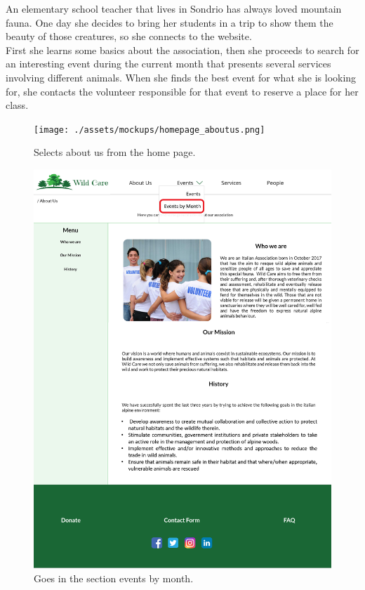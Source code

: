 An elementary school teacher that lives in Sondrio has always loved mountain fauna. One day she decides to bring her students in a trip to show them the beauty of those creatures, so she connects to the website.\\
First she learns some basics about the association, then she proceeds to search for an interesting event during the current month that presents several services involving different animals. When she finds the best event for what she is looking for, she contacts the volunteer responsible for that event to reserve a place for her class.
	\begin{figure}[h!]
		\centering
		\begin{minipage}[b]{1\textwidth}
    			\texttt{[image: ./assets/mockups/homepage\_aboutus.png]}
			\caption{Selects about us from the home page.}
		\end{minipage}
	\end{figure}

	\begin{figure}[h!]
		\centering
		\begin{minipage}[b]{1\textwidth}
    			\includegraphics[width=\textwidth]{./assets/mockups/aboutus_eventsbymonth.png}
			\caption{Goes in the section events by month.}
		\end{minipage}
	\end{figure}


